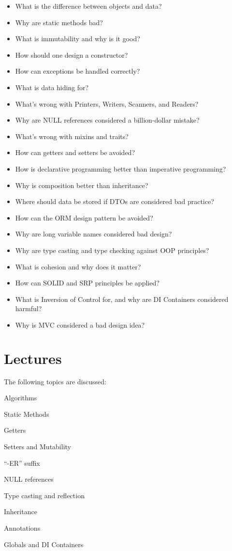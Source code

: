 \documentclass[nobrand,anonymous,nodate,nosecurity]{huawei}
\begin{document}
\begin{itemize}
\item What is the difference between objects and data?
\item Why are static methods bad?
\item What is immutability and why is it good?
\item How should one design a constructor?
\item How can exceptions be handled correctly?
\item What is data hiding for?
\item What's wrong with Printers, Writers, Scanners, and Readers?
\item Why are NULL references considered a billion-dollar mistake?
\item What's wrong with mixins and traits?
\item How can getters and setters be avoided?
\item How is declarative programming better than imperative programming?
\item Why is composition better than inheritance?
\item Where should data be stored if DTOs are considered bad practice?
\item How can the ORM design pattern be avoided?
\item Why are long variable names considered bad design?
\item Why are type casting and type checking against OOP principles?
\item What is cohesion and why does it matter?
\item How can SOLID and SRP principles be applied?
\item What is Inversion of Control for, and why are DI Containers considered harmful?
\item Why is MVC considered a bad design idea?
\end{itemize}

\newpage
\section*{Lectures}

The following topics are discussed:

\begin{lectures}
\item Algorithms
\item Static Methods
\item Getters
\item Setters and Mutability
\item ``-ER'' suffix
\item NULL references
\item Type casting and reflection
\item Inheritance
\item Annotations
\item Globals and DI Containers
\end{lectures}
\end{document}
